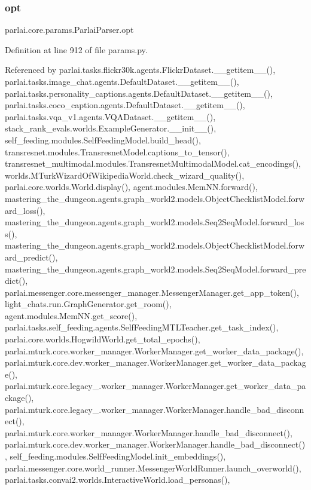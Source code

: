 \subsubsection{\texorpdfstring{opt}{opt}}
{\footnotesize\ttfamily parlai.\+core.\+params.\+Parlai\+Parser.\+opt}



Definition at line 912 of file params.\+py.



Referenced by parlai.\+tasks.\+flickr30k.\+agents.\+Flickr\+Dataset.\+\_\+\+\_\+getitem\+\_\+\+\_\+(), parlai.\+tasks.\+image\+\_\+chat.\+agents.\+Default\+Dataset.\+\_\+\+\_\+getitem\+\_\+\+\_\+(), parlai.\+tasks.\+personality\+\_\+captions.\+agents.\+Default\+Dataset.\+\_\+\+\_\+getitem\+\_\+\+\_\+(), parlai.\+tasks.\+coco\+\_\+caption.\+agents.\+Default\+Dataset.\+\_\+\+\_\+getitem\+\_\+\+\_\+(), parlai.\+tasks.\+vqa\+\_\+v1.\+agents.\+V\+Q\+A\+Dataset.\+\_\+\+\_\+getitem\+\_\+\+\_\+(), stack\+\_\+rank\+\_\+evals.\+worlds.\+Example\+Generator.\+\_\+\+\_\+init\+\_\+\+\_\+(), self\+\_\+feeding.\+modules.\+Self\+Feeding\+Model.\+build\+\_\+head(), transresnet.\+modules.\+Transresnet\+Model.\+captions\+\_\+to\+\_\+tensor(), transresnet\+\_\+multimodal.\+modules.\+Transresnet\+Multimodal\+Model.\+cat\+\_\+encodings(), worlds.\+M\+Turk\+Wizard\+Of\+Wikipedia\+World.\+check\+\_\+wizard\+\_\+quality(), parlai.\+core.\+worlds.\+World.\+display(), agent.\+modules.\+Mem\+N\+N.\+forward(), mastering\+\_\+the\+\_\+dungeon.\+agents.\+graph\+\_\+world2.\+models.\+Object\+Checklist\+Model.\+forward\+\_\+loss(), mastering\+\_\+the\+\_\+dungeon.\+agents.\+graph\+\_\+world2.\+models.\+Seq2\+Seq\+Model.\+forward\+\_\+loss(), mastering\+\_\+the\+\_\+dungeon.\+agents.\+graph\+\_\+world2.\+models.\+Object\+Checklist\+Model.\+forward\+\_\+predict(), mastering\+\_\+the\+\_\+dungeon.\+agents.\+graph\+\_\+world2.\+models.\+Seq2\+Seq\+Model.\+forward\+\_\+predict(), parlai.\+messenger.\+core.\+messenger\+\_\+manager.\+Messenger\+Manager.\+get\+\_\+app\+\_\+token(), light\+\_\+chats.\+run.\+Graph\+Generator.\+get\+\_\+room(), agent.\+modules.\+Mem\+N\+N.\+get\+\_\+score(), parlai.\+tasks.\+self\+\_\+feeding.\+agents.\+Self\+Feeding\+M\+T\+L\+Teacher.\+get\+\_\+task\+\_\+index(), parlai.\+core.\+worlds.\+Hogwild\+World.\+get\+\_\+total\+\_\+epochs(), parlai.\+mturk.\+core.\+worker\+\_\+manager.\+Worker\+Manager.\+get\+\_\+worker\+\_\+data\+\_\+package(), parlai.\+mturk.\+core.\+dev.\+worker\+\_\+manager.\+Worker\+Manager.\+get\+\_\+worker\+\_\+data\+\_\+package(), parlai.\+mturk.\+core.\+legacy\+\_.\+worker\+\_\+manager.\+Worker\+Manager.\+get\+\_\+worker\+\_\+data\+\_\+package(), parlai.\+mturk.\+core.\+legacy\+\_.\+worker\+\_\+manager.\+Worker\+Manager.\+handle\+\_\+bad\+\_\+disconnect(), parlai.\+mturk.\+core.\+worker\+\_\+manager.\+Worker\+Manager.\+handle\+\_\+bad\+\_\+disconnect(), parlai.\+mturk.\+core.\+dev.\+worker\+\_\+manager.\+Worker\+Manager.\+handle\+\_\+bad\+\_\+disconnect(), self\+\_\+feeding.\+modules.\+Self\+Feeding\+Model.\+init\+\_\+embeddings(), parlai.\+messenger.\+core.\+world\+\_\+runner.\+Messenger\+World\+Runner.\+launch\+\_\+overworld(), parlai.\+tasks.\+convai2.\+worlds.\+Interactive\+World.\+load\+\_\+personas(), 